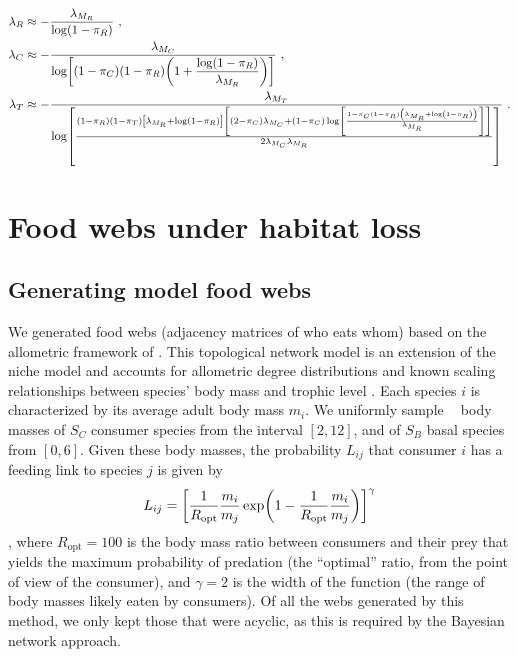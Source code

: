 \documentclass[11pt]{article}
\let\originalleft\left
\let\originalright\right
\renewcommand{\left}{\mathopen{}\mathclose\bgroup\originalleft}
\renewcommand{\right}{\aftergroup\egroup\originalright}
\newcommand*{\logten}{\mathop{\log_{10}}}
\begin{document}
\begin{align}
  \label{eq:BN_lambda_omniv_R_nonspatial_2}
  \lambda_R &\approx -\frac{\lambda_{M_R}}{\log(1 - \pi_R)} \ , \\
  \label{eq:BN_lambda_omniv_C_nonspatial_2}
  \lambda_C &\approx -\frac{\lambda_{M_C}}{\log\left[ (1 - \pi_C) (1 - \pi_R)
              \left( 1+\dfrac{\log(1-\pi_R)}{\lambda_{M_R}}\right)\right]} \ , \\
  \label{eq:BN_lambda_omniv_T_nonspatial_2}
  \lambda_T &\approx -\frac{\lambda_{M_T}}{\log \left[ \frac{(1-\pi_R) (1-\pi_T)
              \left[ \lambda_{M_R} + \log(1-\pi_R) \right] \left[
              (2-\pi _C) \lambda_{M_C} + (1-\pi_C) \log \left[ \frac{1-\pi_C
              (1-\pi_R) \left( \lambda_{M_R} + \log \left(1 - \pi_R \right)
              \right)}{\lambda_{M_R}} \right] \right]}{2 \lambda_{M_C}
              \lambda_{M_R}} \right]} \ .
\end{align}


\newpage


\section{Food webs under habitat loss}

\subsection{Generating model food webs} \label{sec:allo}

We generated food webs (adjacency matrices of who eats whom) based on the allometric framework of \citet{Schneider2016}. This topological network model is an extension of the niche model \citep{Williams2000} and accounts for allometric degree distributions and known scaling relationships between species' body mass and trophic level \citep{Riede2011Size-basedExtinctions}. Each species $i$ is characterized by its average adult body mass $m_i$. We uniformly sample $\logten$ body masses of $S_C$ consumer species from the interval $[2, 12]$, and of $S_B$ basal species from $[0, 6]$. Given these body masses, the probability $L_{ij}$ that consumer $i$ has a feeding link to species $j$ is given by
\begin{equation}
  \label{eq:feeding_prob}
  L_{ij} = \left[ \frac{1}{R_{\text{opt}}} \frac{m_i}{m_j} \exp
    \left( 1 - \frac{1}{R_{\text{opt}}} \frac{m_i}{m_j} \right) \right]^{\gamma}
\end{equation}
\citep{Schneider2016}, where $R_{\text{opt}} = 100$ is the body mass ratio between consumers and their prey that yields the maximum probability of predation (the ``optimal'' ratio, from the point of view of the consumer), and $\gamma = 2$ is the width of the function (the range of body masses likely eaten by consumers). Of all the webs generated by this method, we only kept those that were acyclic, as this is required by the Bayesian network approach.
\end{document}
